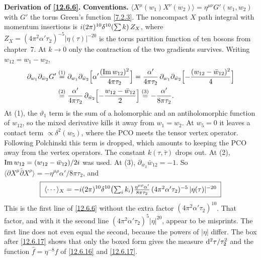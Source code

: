 \begin{tcolorbox}[breakable]
	\begin{remark}
		\textbf{Derivation of \eqref{12.6.6}.} \textbf{Conventions.} $\langle X^{\mu}(w_{1})X^{\nu}(w_{2})\rangle=\eta^{\mu\nu}G'(w_{1},w_{2})$ with $G'$ the torus Green's function \eqref{7.2.3}. The noncompact $X$ path integral with momentum insertions is $i(2\pi)^{10}\delta^{10}(\sum k)\,Z_{X}$, where $Z_{X}=(4\pi^{2}\alpha'\tau_{2})^{-5}|\eta(\tau)|^{-20}$ is the torus partition function of ten bosons from chapter~7. At $k\to0$ only the contraction of the two gradients survives. Writing $w_{12}=w_{1}-w_{2}$,
		\begin{align*}
			\partial_{w_{1}}\partial_{\bar w_{2}}G'
			&\overset{(1)}{=} \partial_{w_{1}}\partial_{\bar w_{2}}\Bigl[\alpha'\frac{(\operatorname{Im}w_{12})^{2}}{4\pi\tau_{2}}\Bigr]
			=\frac{\alpha'}{4\pi\tau_{2}}\,\partial_{w_{1}}\partial_{\bar w_{2}}\Bigl[-\frac{(w_{12}-\bar w_{12})^{2}}{4}\Bigr]\\
			&\overset{(2)}{=} \frac{\alpha'}{4\pi\tau_{2}}\,\partial_{\bar w_{2}}\Bigl[-\frac{w_{12}-\bar w_{12}}{2}\Bigr]
			\overset{(3)}{=} -\frac{\alpha'}{8\pi\tau_{2}} .
		\end{align*}
		At (1), the $\vartheta_{1}$ term is the sum of a holomorphic and an antiholomorphic function of $w_{12}$, so the mixed derivative kills it away from $w_{1}=w_{2}$. At $w_{5}=0$ it leaves a contact term $\propto\delta^{2}(w_{5})$, where the PCO meets the tensor vertex operator. Following Polchinski this term is dropped, which amounts to keeping the PCO away from the vertex operators. The constant $k(\tau,\bar\tau)$ drops out. At (2), $\operatorname{Im}w_{12}=(w_{12}-\bar w_{12})/2i$ was used. At (3), $\partial_{\bar w_{2}}\bar w_{12}=-1$. So $\langle\partial X^{\mu}\bar\partial X^{\rho}\rangle=-\eta^{\mu\rho}\alpha'/8\pi\tau_{2}$, and
		\[
		\boxed{\;\langle\cdots\rangle_{X}=-i(2\pi)^{10}\delta^{10}\bigl(\textstyle\sum_i k_{i}\bigr)\frac{\eta^{\mu\rho}\alpha'}{8\pi\tau_{2}}\,(4\pi^{2}\alpha'\tau_{2})^{-5}\,|\eta(\tau)|^{-20}\;}
		\]
		This is the first line of \eqref{12.6.6} without the extra factor $(4\pi^{2}\alpha'\tau_{2})^{10}$. That factor, and with it the second line $(4\pi^{2}\alpha'\tau_{2})^{5}|\eta|^{20}$, appear to be misprints. The first line does not even equal the second, because the powers of $|\eta|$ differ. The box after \eqref{12.6.17} shows that only the boxed form gives the measure $\mathrm{d}^{2}\tau/\tau_{2}^{2}$ and the function $\hat f=\eta^{-8}f$ of \eqref{12.6.16} and \eqref{12.6.17}.
	\end{remark}
\end{tcolorbox}

